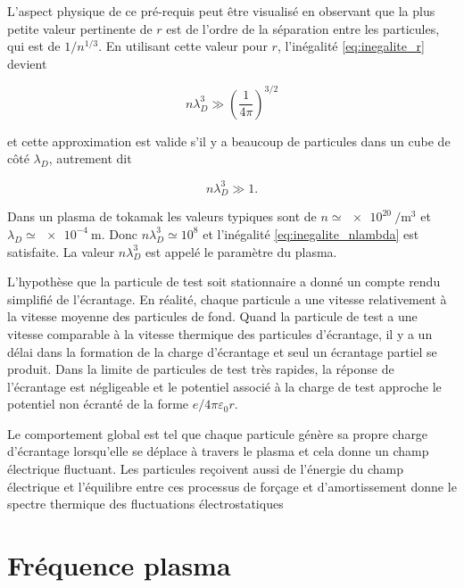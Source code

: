 \documentclass[main.tex]{subfiles}
\begin{document}
\noindent L'aspect physique de ce pré-requis peut être visualisé en observant que la plus petite valeur pertinente de \( r \) est de l'ordre de la séparation entre les particules, qui est de \( 1/n^{1/3} \).
En utilisant cette valeur pour \( r \), l'inégalité \ref{eq:inegalite_r} devient

\[
	n \lambda_D^3 \gg \left(\frac{1}{4\pi} \right)^{3/2}
\]

\noindent et cette approximation est valide s'il y a beaucoup de particules dans un cube de côté \( \lambda_D \), autrement dit

\begin{equation}
	n \lambda_D^3 \gg 1.
	\label{eq:inegalite_nlambda}
\end{equation}

\noindent Dans un plasma de tokamak les valeurs typiques sont de \( n \simeq \SI{e20}{\per\meter\cubed} \) et \( \lambda_D \simeq \SI{e-4}{\meter} \).
Donc \( n \lambda_D^3 \simeq 10^8\) et l'inégalité \ref{eq:inegalite_nlambda} est satisfaite.
La valeur \( n \lambda_D^3 \) est appelé le paramètre du plasma.

L'hypothèse que la particule de test soit stationnaire a donné un compte rendu simplifié de l'écrantage.
En réalité, chaque particule a une vitesse relativement à la vitesse moyenne des particules de fond.
Quand la particule de test a une vitesse comparable à la vitesse thermique des particules d'écrantage, il y a un délai dans la formation de la charge d'écrantage et seul un écrantage partiel se produit.
Dans la limite de particules de test très rapides, la réponse de l'écrantage est négligeable et le potentiel associé à la charge de test approche le potentiel non écranté de la forme \( e/4\pi \varepsilon_0 r \).

Le comportement global est tel que chaque particule génère sa propre charge d'écrantage lorsqu'elle se déplace à travers le plasma et cela donne un champ électrique fluctuant.
Les particules reçoivent aussi de l'énergie du champ électrique et l'équilibre entre ces processus de forçage et d'amortissement donne le spectre thermique des fluctuations électrostatiques

\section{Fréquence plasma}
\label{sec:frequence_plasma}
\end{document}
